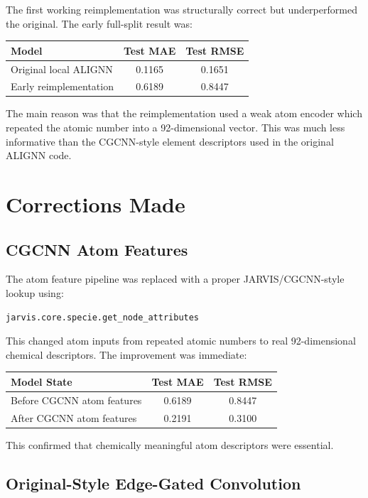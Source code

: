\documentclass[11pt,a4paper]{article}
\begin{document}
The first working reimplementation was structurally correct but underperformed the original. The early full-split result was:

\begin{center}
\begin{tabular}{lcc}
\toprule
Model & Test MAE & Test RMSE \\
\midrule
Original local ALIGNN & 0.1165 & 0.1651 \\
Early reimplementation & 0.6189 & 0.8447 \\
\bottomrule
\end{tabular}
\end{center}

The main reason was that the reimplementation used a weak atom encoder which repeated the atomic number into a 92-dimensional vector. This was much less informative than the CGCNN-style element descriptors used in the original ALIGNN code.

\section{Corrections Made}

\subsection{CGCNN Atom Features}

The atom feature pipeline was replaced with a proper JARVIS/CGCNN-style lookup using:

\begin{verbatim}
jarvis.core.specie.get_node_attributes
\end{verbatim}

This changed atom inputs from repeated atomic numbers to real 92-dimensional chemical descriptors. The improvement was immediate:

\begin{center}
\begin{tabular}{lcc}
\toprule
Model State & Test MAE & Test RMSE \\
\midrule
Before CGCNN atom features & 0.6189 & 0.8447 \\
After CGCNN atom features & 0.2191 & 0.3100 \\
\bottomrule
\end{tabular}
\end{center}

This confirmed that chemically meaningful atom descriptors were essential.

\subsection{Original-Style Edge-Gated Convolution}
\end{document}
